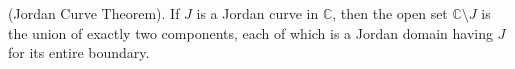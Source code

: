(Jordan Curve Theorem). If $J$ is a Jordan curve in $\mathbb{C}$, then the open set $\mathbb{C} \setminus J$ is the union of exactly two components, each of which is a Jordan domain having $J$ for its entire boundary.
